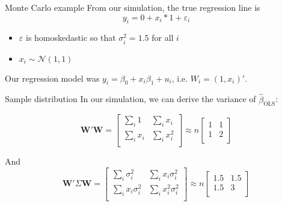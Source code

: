 \documentclass[aspectratio=169,t,11pt,table]{beamer}
\begin{document}
\begin{frame}{Monte Carlo example}
  From our simulation, the true regression line is 
  $$
      y_i = 0 + x_i * 1 + \varepsilon_i
  $$
  \begin{itemize}
    \item $\varepsilon$ is \alert{homoskedastic} so that $\sigma_i^2 = 1.5$ for all $i$
    \item $x_i \sim \mathcal{N}(1, 1)$
  \end{itemize}

  \bigskip
  Our regression model was $y_i = \beta_0 + x_i \beta_1 + u_i$, i.e. $W_i = (1, x_i)'$.
\end{frame}

\begin{frame}{Sample distribution}
  In our simulation, we can derive the variance of $\hat{\beta}_{\text{OLS}}$:

  $$
    \bm{W}' \bm{W} = 
    \begin{bmatrix}
      \sum_i 1 & \sum_i x_i \\
      \sum_i x_i & \sum_i x_i^2 \\
    \end{bmatrix}
    \approx
    n 
    \begin{bmatrix}
      1 & 1 \\
      1 & 2 \\
    \end{bmatrix}
  $$

  And 
  $$ 
    \bm{W}' \Sigma \bm{W} = 
    \begin{bmatrix}
      \sum_i \sigma_i^2 & \sum_i x_i \sigma_i^2 \\
      \sum_i x_i \sigma_i^2 & \sum_i x_i^2 \sigma_i^2 \\
    \end{bmatrix}
    \approx
    n 
    \begin{bmatrix}
      1.5 & 1.5 \\
      1.5 & 3 \\
    \end{bmatrix}
  $$
\end{frame}
\end{document}

